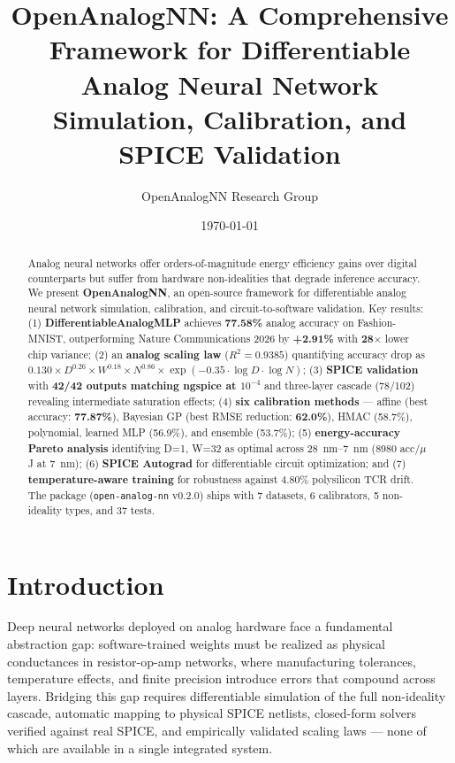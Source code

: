 \documentclass[10pt,twocolumn]{article}
\title{OpenAnalogNN: A Comprehensive Framework for Differentiable Analog Neural Network Simulation, Calibration, and SPICE Validation}
\author{OpenAnalogNN Research Group}
\date{\today}
\begin{document}
\maketitle

\begin{abstract}
Analog neural networks offer orders-of-magnitude energy efficiency gains over digital counterparts but suffer from hardware non-idealities that degrade inference accuracy. We present \textbf{OpenAnalogNN}, an open-source framework for differentiable analog neural network simulation, calibration, and circuit-to-software validation. Key results: (1) \textbf{DifferentiableAnalogMLP} achieves \textbf{77.58\%} analog accuracy on Fashion-MNIST, outperforming Nature Communications 2026 by \textbf{+2.91\%} with \textbf{28$\times$} lower chip variance; (2) an \textbf{analog scaling law} ($R^2 = 0.9385$) quantifying accuracy drop as $0.130 \times D^{0.26} \times W^{0.18} \times N^{0.86} \times \exp(-0.35 \cdot \log D \cdot \log N)$; (3) \textbf{SPICE validation} with \textbf{42/42 outputs matching ngspice at $10^{-4}$} and three-layer cascade (78/102) revealing intermediate saturation effects; (4) \textbf{six calibration methods} --- affine (best accuracy: \textbf{77.87\%}), Bayesian GP (best RMSE reduction: \textbf{62.0\%}), HMAC (58.7\%), polynomial, learned MLP (56.9\%), and ensemble (53.7\%); (5) \textbf{energy-accuracy Pareto analysis} identifying D=1, W=32 as optimal across 28~nm--7~nm (8980 acc/$\mu$J at 7~nm); (6) \textbf{SPICE Autograd} for differentiable circuit optimization; and (7) \textbf{temperature-aware training} for robustness against 4.80\% polysilicon TCR drift. The package (\texttt{open-analog-nn} v0.2.0) ships with 7 datasets, 6 calibrators, 5 non-ideality types, and 37 tests.
\end{abstract}

\section{Introduction}

Deep neural networks deployed on analog hardware face a fundamental abstraction gap: software-trained weights must be realized as physical conductances in resistor-op-amp networks, where manufacturing tolerances, temperature effects, and finite precision introduce errors that compound across layers. Bridging this gap requires differentiable simulation of the full non-ideality cascade, automatic mapping to physical SPICE netlists, closed-form solvers verified against real SPICE, and empirically validated scaling laws --- none of which are available in a single integrated system.
\end{document}
